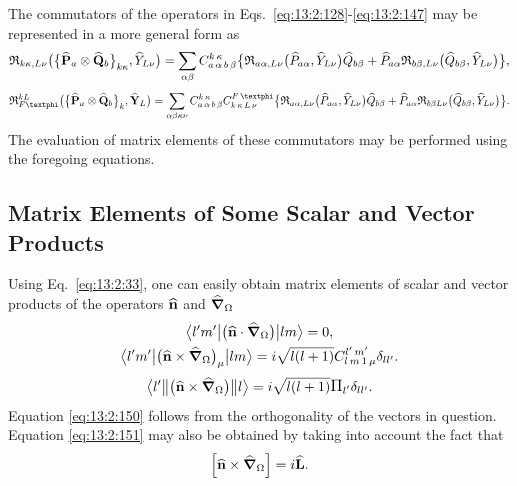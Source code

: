 The commutators of the operators in Eqs.~\eqref{eq:13:2:128}-\eqref{eq:13:2:147} may be represented in a more general form as
\begin{gather}
\mathfrak{R}_{k \kappa, L \nu}\bigl(\bigl\{\widehat{\mathbf{P}}_{a} \otimes \widehat{\mathbf{Q}}_{b}\bigr\}_{k \kappa}, \widehat{Y}_{L \nu}\bigr)=\sum_{\alpha \beta} 
C_{a\,\alpha\,b\,\beta}^{k\,\kappa}\bigl\{\mathfrak{R}_{a \alpha, L \nu}\bigl(\widehat{P}_{a \alpha}, \widehat{Y}_{L \nu}\bigr) \widehat{Q}_{b \beta}+\widehat{P}_{a \alpha} \mathfrak{R}_{b \beta, L \nu}\bigl(\widehat{Q}_{b \beta}, \widehat{Y}_{L \nu}\bigr)\bigr\},  \label{eq:13:2:148}
\end{gather}
\begin{gather}
\mathfrak{R}_{F \varphi}^{k L}\bigl(\bigl\{\widehat{\vect{P}}_{a} \otimes \widehat{\vect{Q}}_{b}\bigr\}_{k}, \widehat{\vect{Y}}_{L}\bigr)=\sum_{\alpha \beta \kappa \nu} 
\clebsch{a}{\alpha}{b}{\beta}{k}{\kappa} 
\clebsch{k}{\kappa}{L}{\nu}{F}{\varphi}\bigl\{\mathfrak{R}_{a \alpha, L \nu}\bigl(\widehat{P}_{a \alpha}, \widehat{Y}_{L \nu}\bigr) \widehat{Q}_{b \beta}+\widehat{P}_{a \alpha} \mathfrak{R}_{b \beta L \nu}\bigl(\widehat{Q}_{b \beta}, \widehat{Y}_{L \nu}\bigr)\bigr\}. \label{eq:13:2:149}
\end{gather}
The evaluation of matrix elements of these commutators may be performed using the foregoing equations.

\subsection{Matrix Elements of Some Scalar and Vector Products}\label{sec:13.2.9}
Using Eq.~\eqref{eq:13:2:33}, one can easily obtain matrix elements of scalar and vector products of the operators \(\widehat{\mathbf{n}}\) and \(\widehat{\boldsymbol{\nabla}}_{\Omega}\)
\begin{gather}
\bigl\langle l^{\prime} m^{\prime} \big| \bigl(\widehat{\mathbf{n}} \cdot \widehat{\boldsymbol{\nabla}}_{\Omega}\bigr) \big| l m \bigr\rangle=0,  \label{eq:13:2:150}\\
\bigl\langle  l^{\prime} m^{\prime} \big| \bigl(\widehat{\mathbf{n}} \times\widehat{\boldsymbol{\nabla}}_{\Omega}\bigr)_{\mu} \big| l m \bigr\rangle=i \sqrt{l(l+1)} 
C_{l\,m\,1\,\mu}^{l^{\prime}\,m^{\prime}} \delta_{l l^{\prime}}. \label{eq:13:2:151}
\end{gather}
\begin{equation*}
\braOketred{ l^{\prime}}{\bigl(\widehat{\vect{n}} \times\delop_{\Omega}\bigr)}{l}=i \sqrt{l(l+1)} \Fact{l^{\prime}} \delta_{l l^{\prime}}.
\end{equation*}
Equation \eqref{eq:13:2:150} follows from the orthogonality of the vectors in question. Equation \eqref{eq:13:2:151} may also be obtained by taking into account the fact that
\begin{equation*}
\left[\widehat{\mathbf{n}} \times \widehat{\boldsymbol{\nabla}}_{\Omega}\right]=i \widehat{\mathbf{L}} .
\end{equation*}

